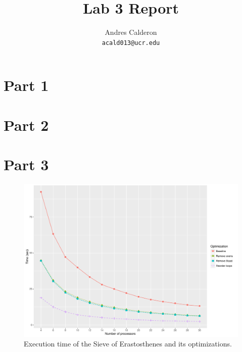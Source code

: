 \documentclass[10pt]{scrartcl}
\title{Lab 3 Report}
\author{
   Andres Calderon\\
  \small \texttt{acald013@ucr.edu}
}
\begin{document}
\maketitle

\section{Part 1}

\section{Part 2}


\section{Part 3}
\begin{figure}
  \centering
  \includegraphics[width=\textwidth]{plot}
  \caption{Execution time of the Sieve of Erastosthenes and its optimizations.}\label{fig:plot}
\end{figure}
\end{document}
